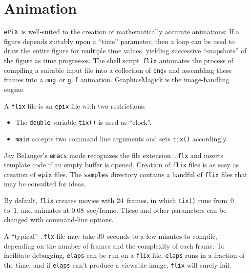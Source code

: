 \documentclass[12pt,letterpaper]{book}
\newcommand{\code}[1]{\texttt{#1}}
\newcommand{\filename}[1]{\texttt{#1}}
\newcommand{\ePiX}{\code{ePiX}}
\newcommand{\CXX}{\code{C++}}
\newcommand{\teximath}[1]{$#1$}
\begin{document}
\index{Cplusplus@\CXX|)}


\section{Animation}
\label{section-animation}

\ePiX\ is well-suited to the creation of mathematically accurate
animations: If a figure depends suitably upon a ``time'' parameter,
then a loop can be used to draw the entire figure for multiple time
values, yielding successive ``snapshots'' of the figure as time
progresses. The shell script~\code{flix} automates the process of
compiling a suitable input file into a collection of \filename{png}s
and assembling these frames into a \filename{mng}~or \filename{gif}
animation. GraphicsMagick is the image-handling engine.

A \code{flix} file is an \code{epix} file with two restrictions:
\begin{itemize}
  \item The \code{double} variable \code{tix()} is used as
  ``clock''.

  \item \code{main} accepts two command line arguments and sets
  \code{tix()} accordingly.
\end{itemize}
\index{Emacs@\code{emacs}}
Jay Belanger's \code{emacs} mode recognizes the file
extension~\filename{.flx} and inserts template code if an empty buffer
is opened. Creation of \code{flix} files is as easy as creation of
\code{epix} files.  The \filename{samples} directory contains a
handful of \code{flix} files that may be consulted for ideas.

By default, \code{flix} creates movies with 24~frames, in which
\code{tix()} runs from~0 to~1, and animates at
\teximath{0.08}~sec/frame.  These and other parameters can be changed
with command-line options.

A ``typical'' \code{.flx} file may take 30~seconds to a few minutes to
compile, depending on the number of frames and the complexity of each
frame. To facilitate debugging, \code{elaps} can be run on a
\code{flix} file. \code{elaps} runs in a fraction of the time, and if
\code{elaps} can't produce a viewable image, \code{flix} will surely
fail.
\end{document}
